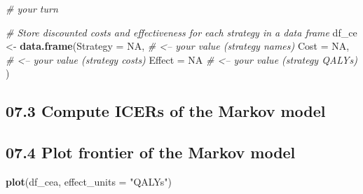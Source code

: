 \documentclass[
]{article}
\newenvironment{Shaded}{\begin{snugshade}}{\end{snugshade}}
\newcommand{\CommentTok}[1]{\textcolor[rgb]{0.56,0.35,0.01}{\textit{#1}}}
\newcommand{\DataTypeTok}[1]{\textcolor[rgb]{0.13,0.29,0.53}{#1}}
\newcommand{\KeywordTok}[1]{\textcolor[rgb]{0.13,0.29,0.53}{\textbf{#1}}}
\newcommand{\NormalTok}[1]{#1}
\newcommand{\OperatorTok}[1]{\textcolor[rgb]{0.81,0.36,0.00}{\textbf{#1}}}
\newcommand{\OtherTok}[1]{\textcolor[rgb]{0.56,0.35,0.01}{#1}}
\newcommand{\StringTok}[1]{\textcolor[rgb]{0.31,0.60,0.02}{#1}}
\begin{document}
\begin{Shaded}
\begin{Highlighting}[]
\CommentTok{# your turn}

\CommentTok{# Store discounted costs and effectiveness for each strategy in a data frame}
\NormalTok{df_ce       <-}\StringTok{ }\KeywordTok{data.frame}\NormalTok{(}\DataTypeTok{Strategy =} \OtherTok{NA}\NormalTok{, }\CommentTok{# <-- your value (strategy names)}
                          \DataTypeTok{Cost     =} \OtherTok{NA}\NormalTok{, }\CommentTok{# <-- your value (strategy costs)}
                          \DataTypeTok{Effect   =} \OtherTok{NA}  \CommentTok{# <-- your value (strategy QALYs)}
\NormalTok{                          )}
\end{Highlighting}
\end{Shaded}

\hypertarget{compute-icers-of-the-markov-model}{%
\subsection{07.3 Compute ICERs of the Markov
model}\label{compute-icers-of-the-markov-model}}

\begin{Shaded}
\end{Shaded}

\hypertarget{plot-frontier-of-the-markov-model}{%
\subsection{07.4 Plot frontier of the Markov
model}\label{plot-frontier-of-the-markov-model}}

\begin{Shaded}
\begin{Highlighting}[]
\KeywordTok{plot}\NormalTok{(df_cea, }\DataTypeTok{effect_units =} \StringTok{"QALYs"}\NormalTok{)}
\end{Highlighting}
\end{Shaded}
\end{document}
